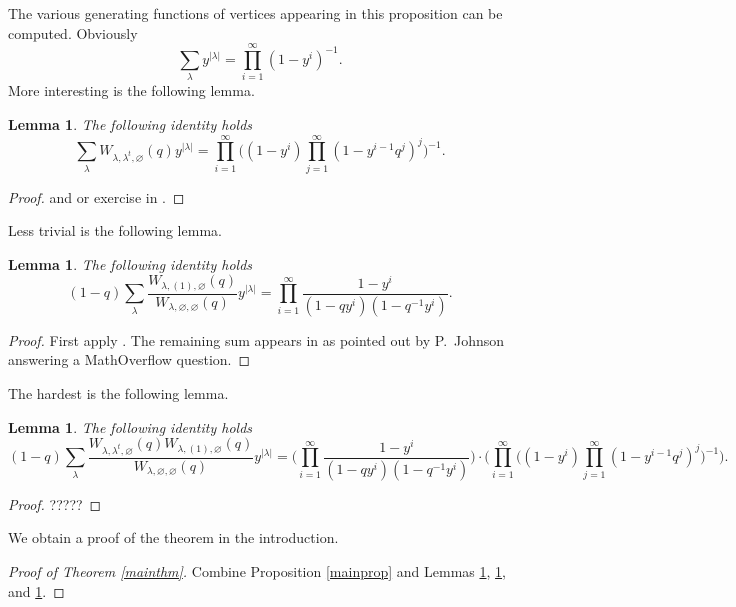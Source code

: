 \documentclass[12pt]{amsart}
\newtheorem{lemma}[theorem]{Lemma}
\theoremstyle{definition}
\theoremstyle{property}
\renewcommand\_{^{}_}
\begin{document}
The various generating functions of vertices appearing in this proposition can be computed. Obviously
\[
\sum_\lambda y^{|\lambda|} = \prod_{i=1}^{\infty} (1-y^i)^{-1}.
\]
More interesting is the following lemma.
\begin{lemma} \label{lem9}
The following identity holds
\[
\sum_{\lambda} W_{\lambda, \lambda^{t}, \varnothing}(q) y^{|\lambda|} = \prod_{i=1}^{\infty} \Big( (1-y^i) \prod_{j = 1}^{\infty} (1-y^{i-1} q^j)^j \Big)^{-1}.
\]
\end{lemma}
\begin{proof}
\cite{ORV} and \cite{MacD} or exercise in \cite{Sta}.
\end{proof}
Less trivial is the following lemma.
\begin{lemma} \label{lem10}
The following identity holds
\[
(1-q) \sum_{\lambda} \frac{W_{\lambda, (1), \varnothing}(q)}{W_{\lambda,\varnothing,\varnothing}(q)} y^{|\lambda|} = \prod_{i=1}^{\infty} \frac{1-y^i}{(1-q y^i)(1-q^{-1} y^i)} .
\]
\end{lemma}
\begin{proof}
First apply \cite{ORV}. The remaining sum appears in \cite{BO} as pointed out by P.~Johnson answering a MathOverflow question. 
\end{proof}
The hardest is the following lemma.
\begin{lemma} \label{lem11}
The following identity holds
\[
(1-q) \sum_{\lambda} \frac{W_{\lambda, \lambda^t, \varnothing}(q) W_{\lambda, (1), \varnothing}(q)}{W_{\lambda,\varnothing,\varnothing}(q)} y^{|\lambda|} = \Bigg( \prod_{i=1}^{\infty} \frac{1-y^i}{(1-q y^i)(1-q^{-1} y^i)} \Bigg) \cdot \Bigg( \prod_{i=1}^{\infty} \Big( (1-y^i) \prod_{j = 1}^{\infty} (1-y^{i-1} q^j)^j \Big)^{-1} \Bigg).
\]
\end{lemma}
\begin{proof}
?????
\end{proof}
We obtain a proof of the theorem in the introduction.
\begin{proof} [Proof of Theorem \ref{mainthm}]
Combine Proposition \ref{mainprop} and Lemmas \ref{lem9}, \ref{lem10}, and \ref{lem11}. 
\end{proof}

\newpage
\end{document}
